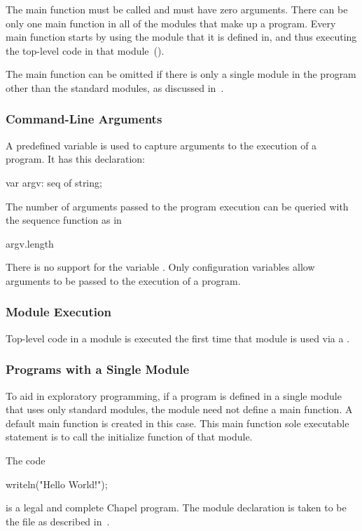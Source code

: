 The main function must be called  and must have zero
arguments.  There can be only one main function in all of the modules
that make up a program.  Every main function starts by using the
module that it is defined in, and thus executing the top-level code in
that module~().

The main function can be omitted if there is only a single module in
the program other than the standard modules, as discussed
in~.

\subsubsection{Command-Line Arguments}
\label{Command_Line_Arguments}

A predefined variable is used to capture arguments to the execution of
a program.  It has this declaration:
\begin{chapel}
var argv: seq of string;
\end{chapel}
The number of arguments passed to the program execution can be queried
with the sequence  function as in
\begin{chapel}
argv.length
\end{chapel}

\begin{status}
There is no support for the variable .  Only configuration
variables allow arguments to be passed to the execution of a program.
\end{status}

\subsubsection{Module Execution}
\label{Module_Execution}

Top-level code in a module is executed the first time that module is
used via a .

\subsubsection{Programs with a Single Module}
\label{Programs_with_a_Single_Module}


To aid in exploratory programming, if a program is defined in a single
module that uses only standard modules, the module need not define a
main function.  A default main function is created in this case.  This
main function sole executable statement is to call the initialize
function of that module.
\begin{example}
The code
\begin{chapel}
writeln("Hello World!");
\end{chapel}
is a legal and complete Chapel program.  The module declaration is
taken to be the file as described in~.
\end{example}

